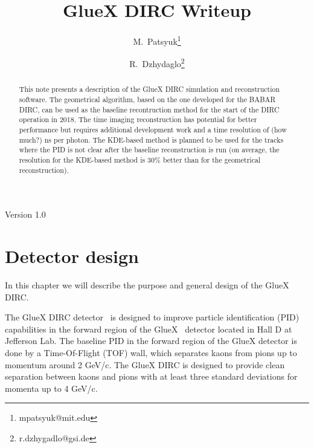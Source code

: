 \documentclass[11pt, a4paper]{article}
\title{GlueX DIRC Writeup}
\author[1]{M.~Patsyuk\thanks{mpatsyuk@mit.edu}}
\author[2]{R.~Dzhydaglo\thanks{r.dzhygadlo@gsi.de}}
\affil[1]{\small{Massachusetts Institute of Technology, Cambridge, USA}}
\affil[2]{\small{GSI Helmholtzzentrum f{\"u}r Schwerionenforschung GmbH, Darmstadt, Germany}}
\date{\vspace{-5ex}}
\begin{document}
\maketitle

\begin{abstract}
This note presents a description of the GlueX DIRC simulation and reconstruction software. The geometrical algorithm, based on the one developed for the BABAR DIRC, can be used as the baseline recontruction method for the start of the DIRC operation in 2018. The time imaging reconstruction has potential for better performance but requires additional development work and a time resolution of (how much?) ns per photon. The KDE-based method is planned to be used for the tracks where the PID is not clear after the baseline reconstruction is run (on average, the resolution for the KDE-based method is 30{\%} better than for the geometrical reconstruction).
\end{abstract}

\vspace{5 cm}
Version 1.0

\newpage

\tableofcontents

\newpage

\section{Detector design}

In this chapter we will describe the purpose and general design of the GlueX DIRC.

The GlueX DIRC detector~\cite{dirc} is designed to improve particle identification (PID) capabilities in the forward region of the GlueX~\cite{gluex1, gluex2} detector located in Hall D at Jefferson Lab. The baseline PID in the forward region of the GlueX detector is done by a Time-Of-Flight (TOF) wall, which separates kaons from pions up to momentum around 2 GeV/c. The GlueX DIRC is designed to provide clean separation between kaons and pions with at least three standard deviations for momenta up to 4 GeV/c.
\end{document}
